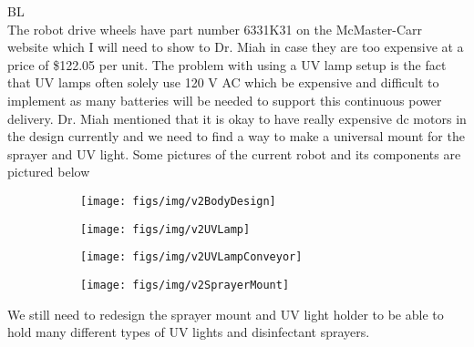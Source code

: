 \documentclass[fontsize=11pt, %
                             paper=a4, %
                             twoside, %
                             captions=tableheading,
                             index=totoc,
                             hyperref]{labbook}
\begin{document}
\begin{addmargin}[0cm]{0cm}
BL\\
The robot drive wheels have part number 6331K31 on the McMaster-Carr website which I will need to show to Dr. Miah in case they are too expensive at a price of \$122.05 per unit. The problem with using a UV lamp setup is the fact that UV lamps often solely use 120 V AC which be expensive and difficult to implement as many batteries will be needed to support this continuous power delivery. Dr. Miah mentioned that it is okay to have really expensive dc motors in the design currently and we need to find a way to make a universal mount for the sprayer and UV light. Some pictures of the current robot and its components are pictured below
\begin{figure}[H]
\begin{subfigure}{.5\textwidth}
\centering
\texttt{[image: figs/img/v2BodyDesign]}
\end{subfigure}
\begin{subfigure}{.5\textwidth}
\centering
\texttt{[image: figs/img/v2UVLamp]}
\end{subfigure}
\begin{subfigure}{.5\textwidth}
\centering
\texttt{[image: figs/img/v2UVLampConveyor]}
\end{subfigure}
\begin{subfigure}{.5\textwidth}
\centering
\texttt{[image: figs/img/v2SprayerMount]}
\end{subfigure}
\end{figure}
We still need to redesign the sprayer mount and UV light holder to be able to hold many different types of UV lights and disinfectant sprayers.


\end{addmargin}
\end{document}
